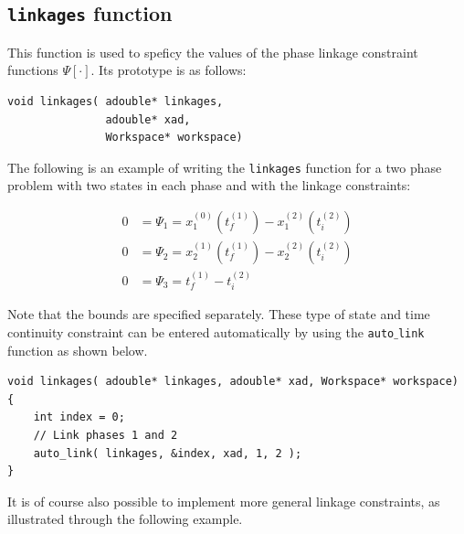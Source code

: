 \documentclass[a4paper,11pt]{report}    %
\newenvironment{shadedframe}{%
  \def\FrameCommand{\fcolorbox{black}{shadecolor}}%
  \MakeFramed {\FrameRestore}}
{\endMakeFramed}
\begin{document}
\subsection{\texttt{linkages} function}
This function is used to speficy the values of the phase linkage constraint functions $\Psi[\cdot]$. Its prototype is as follows:

\begin{verbatim}
void linkages( adouble* linkages, 
               adouble* xad,
               Workspace* workspace)
\end{verbatim}

\begin{shadedframe}
 The following is an example of writing the \texttt{linkages} function for a two phase problem with two
states in each phase and with the linkage constraints:

   \begin{equation}
        \begin{aligned}
             0 &= \Psi_1 = x_1^{(0)}(t_f^{(1)})-x_1^{(2)} (t_i^{(2)} )  \\
             0 &= \Psi_2 = x_2^{(1)}(t_f^{(1)})-x_2^{(2)} (t_i^{(2)} ) \\
             0 &= \Psi_3 = t_f^{(1)} - t_i^{(2)} 
        \end{aligned}
   \end{equation}
\end{shadedframe}

Note that the bounds are specified separately. These type of state and time continuity
constraint can be entered automatically by using the \texttt{auto$\_$link} function as
shown below. 

\begin{verbatim}
void linkages( adouble* linkages, adouble* xad, Workspace* workspace)
{
    int index = 0;
    // Link phases 1 and 2 
    auto_link( linkages, &index, xad, 1, 2 );
}
\end{verbatim}


It is of course also possible to implement more general linkage constraints, as 
illustrated through the following example.
\end{document}
